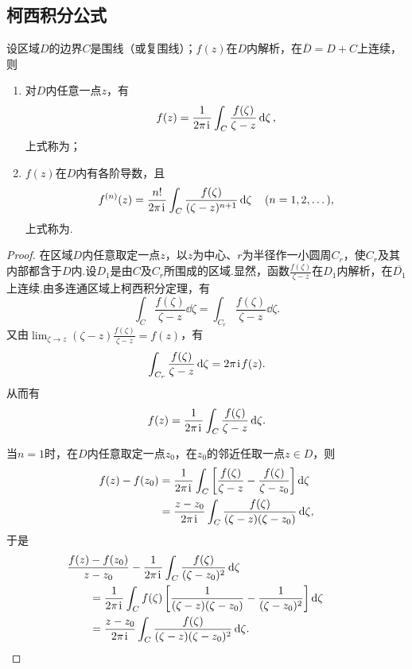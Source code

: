 \subsection{柯西积分公式}
\begin{theorem}\label{theorem:解析函数的积分表示.柯西积分公式}
设区域\(D\)的边界\(C\)是围线（或复围线）；\(f(z)\)在\(D\)内解析，在\(\overline{D}=D+C\)上连续，则\begin{enumerate}
\item 对\(D\)内任意一点\(z\)，有\begin{equation}\label{equation:解析函数的积分表示.柯西积分公式}
f(z) = \frac{1}{2\pi\kern1pt\mathrm{i}\kern1pt} \int_C \frac{f(\zeta)}{\zeta-z} \dd{\zeta},
\end{equation}上式称为；
\item \(f(z)\)在\(D\)内有各阶导数，且\begin{equation}\label{equation:解析函数的积分表示.柯西高阶导数公式}
f^{(n)}(z) = \frac{n!}{2\pi\kern1pt\mathrm{i}\kern1pt} \int_C \frac{f(\zeta)}{(\zeta-z)^{n+1}} \dd{\zeta} \quad (n=1,2,\dots),
\end{equation}上式称为.
\end{enumerate}
\begin{proof}
在区域\(D\)内任意取定一点\(z\)，以\(z\)为中心、\(r\)为半径作一小圆周\(C_r\)，使\(C_r\)及其内部都含于\(D\)内.设\(D_1\)是由\(C\)及\(C_r\)所围成的区域.显然，函数\(\frac{f(\zeta)}{\zeta-z}\)在\(D_1\)内解析，在\(\overline{D_1}\)上连续.由多连通区域上柯西积分定理，有\[
\int_C{\frac{f(\zeta)}{\zeta-z}\dd{\zeta}}
= \int_{C_r}{\frac{f(\zeta)}{\zeta-z}\dd{\zeta}}.
\]又由\(\lim_{\zeta \to z} (\zeta-z) \frac{f(\zeta)}{\zeta-z} = f(z)\)，有\[
\int_{C_r}{\frac{f(\zeta)}{\zeta-z}\dd{\zeta}} = 2\pi\kern1pt\mathrm{i}\kern1pt f(z).
\]从而有\[
f(z) = \frac{1}{2\pi\kern1pt\mathrm{i}\kern1pt} \int_C{\frac{f(\zeta)}{\zeta-z}\dd{\zeta}}.
\]

当\(n=1\)时，在\(D\)内任意取定一点\(z_0\)，在\(z_0\)的邻近任取一点\(z \in D\)，则\begin{align*}
f(z)-f(z_0)
&= \frac{1}{2\pi\kern1pt\mathrm{i}\kern1pt} \int_C{\left[\frac{f(\zeta)}{\zeta-z}-\frac{f(\zeta)}{\zeta-z_0}\right]\dd{\zeta}} \\
&= \frac{z-z_0}{2\pi\kern1pt\mathrm{i}\kern1pt} \int_C{\frac{f(\zeta)}{(\zeta-z)(\zeta-z_0)}\dd{\zeta}},
\end{align*}
于是\begin{align*}
&\hspace{-20pt}\frac{f(z)-f(z_0)}{z-z_0} - \frac{1}{2\pi\iu} \int_C{\frac{f(\zeta)}{(\zeta-z_0)^2} \dd{\zeta}} \\
&=\frac{1}{2\pi\iu} \int_C{f(\zeta) \left[\frac{1}{(\zeta-z)(\zeta-z_0)}-\frac{1}{(\zeta-z_0)^2}\right]\dd{\zeta}} \\
&=\frac{z-z_0}{2\pi\iu} \int_C{\frac{f(\zeta)}{(\zeta-z)(\zeta-z_0)^2}\dd{\zeta}}.
\end{align*}


\end{proof}
\end{theorem}
